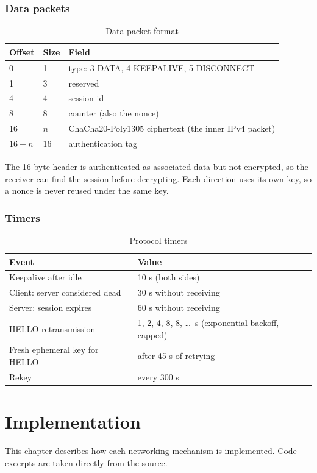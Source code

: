 \documentclass[12pt,a4paper]{report}
\begin{document}
\subsection{Data packets}
\begin{table}[H]
\centering
\caption{Data packet format}
\begin{tabular}{@{}lll@{}}
\toprule
\textbf{Offset} & \textbf{Size} & \textbf{Field}\\
\midrule
0 & 1 & type: 3 DATA, 4 KEEPALIVE, 5 DISCONNECT\\
1 & 3 & reserved\\
4 & 4 & session id\\
8 & 8 & counter (also the nonce)\\
16 & $n$ & ChaCha20-Poly1305 ciphertext (the inner IPv4 packet)\\
$16+n$ & 16 & authentication tag\\
\bottomrule
\end{tabular}
\end{table}
The 16-byte header is authenticated as associated data but not encrypted, so the
receiver can find the session before decrypting. Each direction uses its own key, so
a nonce is never reused under the same key.

\subsection{Timers}
\begin{table}[H]
\centering
\caption{Protocol timers}
\begin{tabular}{@{}ll@{}}
\toprule
\textbf{Event} & \textbf{Value}\\
\midrule
Keepalive after idle & 10 s (both sides)\\
Client: server considered dead & 30 s without receiving\\
Server: session expires & 60 s without receiving\\
HELLO retransmission & 1, 2, 4, 8, 8, \ldots\ s (exponential backoff, capped)\\
Fresh ephemeral key for HELLO & after 45 s of retrying\\
Rekey & every 300 s\\
\bottomrule
\end{tabular}
\end{table}

\chapter{Implementation}\label{ch:impl}
This chapter describes how each networking mechanism is implemented. Code excerpts
are taken directly from the source.
\end{document}
